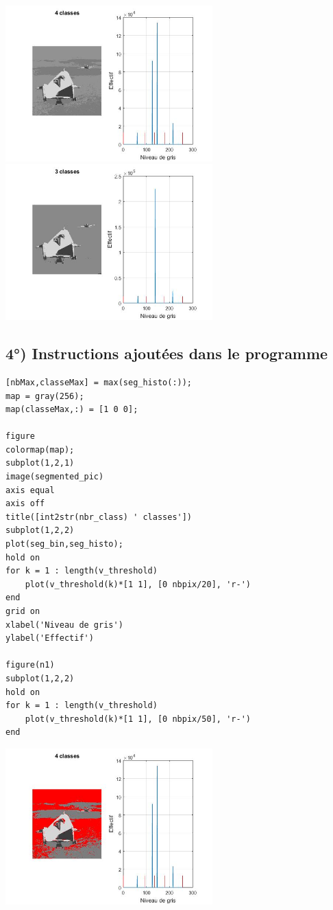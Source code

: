 \documentclass{article}
\begin{document}
\includegraphics[width=8cm]{liftingbody_4classes.jpg}
\includegraphics[width=8cm]{liftingbody_3classes.jpg}
\subsection*{4°) Instructions ajoutées dans le programme}
\begin{lstlisting}
[nbMax,classeMax] = max(seg_histo(:));
map = gray(256);
map(classeMax,:) = [1 0 0];
 
figure
colormap(map);
subplot(1,2,1)
image(segmented_pic)
axis equal
axis off
title([int2str(nbr_class) ' classes'])
subplot(1,2,2)
plot(seg_bin,seg_histo);
hold on
for k = 1 : length(v_threshold)
    plot(v_threshold(k)*[1 1], [0 nbpix/20], 'r-')
end
grid on
xlabel('Niveau de gris')
ylabel('Effectif')
 
figure(n1)
subplot(1,2,2)
hold on
for k = 1 : length(v_threshold)
    plot(v_threshold(k)*[1 1], [0 nbpix/50], 'r-')
end
\end{lstlisting}

\includegraphics[width=8cm]{liftingbody_rouge.jpg}
\end{document}
